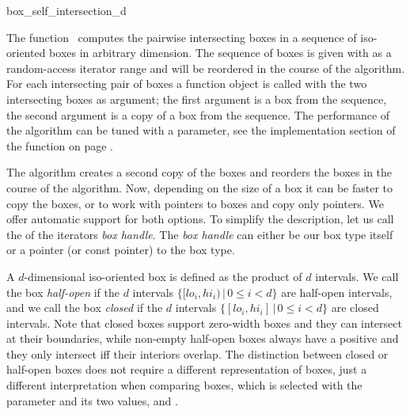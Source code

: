 

\begin{ccRefFunction}{box_self_intersection_d}

\ccDefinition
  
The function \ccRefName\ computes the pairwise intersecting boxes
in a sequence of iso-oriented boxes in arbitrary dimension.
The sequence of boxes is given with as a random-access iterator
range and will be reordered in the course of the algorithm. For each
intersecting pair of boxes a  function object is called
with the two intersecting boxes as argument; the first argument is a
box from the sequence, the second argument is a copy of a box from the
sequence.  The performance of the algorithm can be tuned with a
 parameter, see the implementation section of the
 function on page
\pageref{ccRef_CGAL::box_intersection_d}.  

The algorithm creates a second copy of the boxes and reorders the
boxes in the course of the algorithm. Now, depending on the size of a
box it can be faster to copy the boxes, or to work with pointers to
boxes and copy only pointers. We offer automatic support for both
options. To simplify the description, let us call the 
of the iterators \emph{box handle}.  The \emph{box handle\/} can
either be our box type itself or a pointer (or const pointer) to the
box type.

A $d$-dimensional iso-oriented box is defined as the
 product of $d$ intervals. We call the
box \emph{half-open} if the $d$ intervals $\{ [lo_i,hi_i) \,|\, 0 \leq
i < d\}$ are half-open intervals, and we call the box \emph{closed} if
the $d$ intervals $\{ [lo_i,hi_i] \,|\, 0 \leq i < d\}$ are closed
intervals. Note that closed boxes support zero-width boxes and they
can intersect at their boundaries, while non-empty half-open boxes
always have a positive  and they only intersect iff their
interiors overlap.  The distinction between closed or half-open boxes
does not require a different representation of boxes, just a different
interpretation when comparing boxes, which is selected with the
 parameter and its two values,
 and
.


\end{ccRefFunction}
